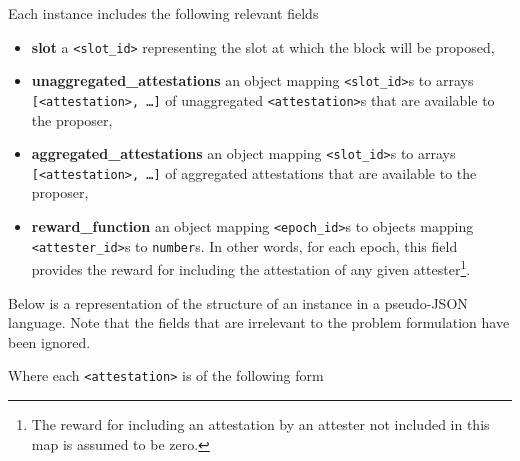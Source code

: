 \documentclass{article}
\begin{document}
Each instance includes the following relevant fields
%
\begin{itemize} 
  \item \textbf{slot} a \texttt{<slot\_id>} representing the slot at which
  the block will be proposed,
  \item \textbf{unaggregated\_attestations} an object mapping
  \texttt{<slot\_id>}s to arrays \texttt{[<attestation>, \dots]} of
  unaggregated \texttt{<attestation>}s that are available to the proposer,
  \item \textbf{aggregated\_attestations} an object mapping
  \texttt{<slot\_id>}s to arrays \texttt{[<attestation>, \dots]} of aggregated
  attestations that are available to the proposer,
  \item \textbf{reward\_function} an object mapping \texttt{<epoch\_id>}s to
  objects mapping \texttt{<attester\_id>}s to \texttt{number}s. In other words,
  for each epoch, this field provides the reward for including the attestation
  of any given attester\footnote{The reward for including an attestation by an
  attester not included in this map is assumed to be zero.}.
\end{itemize}

Below is a representation of the structure of an instance in a pseudo-JSON
language. Note that the fields that are irrelevant to the problem formulation
have been ignored.



\noindent
Where each \texttt{<attestation>} is of the following form





\end{document}
